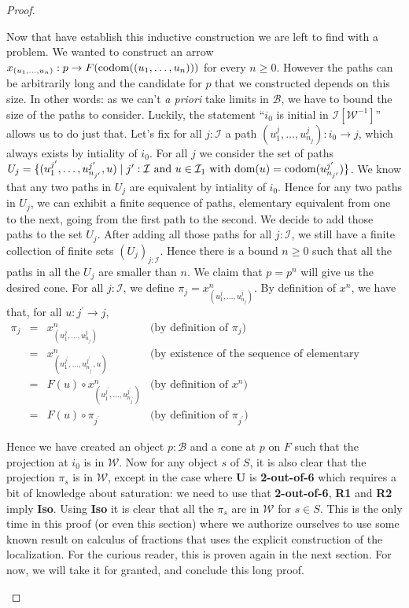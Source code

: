 \documentclass{article}
\numberwithin{equation}{section}
\theoremstyle{definition}
\theoremstyle{plain}
\begin{document}
\begin{proof}
\begin{enumerate}
		Now that have establish this inductive construction we are left to find with a problem. We wanted to construct an arrow $x_{(u_1, \dots, u_n)}: p \to F(\textnormal{codom}((u_1, \dots, u_n)))$ for every $n \ge 0$. However the paths can be arbitrarily long and the candidate for $p$ that we constructed depends on this size. In other words: as we can't \textit{a priori} take limits in $\mathcal{B}$, we have to bound the size of the paths to consider. Luckily, the statement ``$i_0$ is initial in $\mathcal{I}[\mathcal{W}^{-1}]$'' allows us to do just that. Let's fix for all $j:\mathcal{I}$ a path $(u^j_1, \dots, u^j_{n_j}): i_0 \to j$, which always exists by intiality of $i_0$. For all $j$ we consider the set of paths $U_j = \{(u^{j^{\prime}}_1, \dots, u^{j^{\prime}}_{n_{j^{\prime}}},u) \mid j^{\prime}: \mathcal{I} \textnormal{ and } u \in \mathcal{I}_1 \textnormal{ with dom}(u) = \textnormal{codom}(u^{j^{\prime}}_{n_{j^{\prime}}})\}$. We know that any two paths in $U_j$ are equivalent by intiality of $i_0$. Hence for any two paths in $U_j$, we can exhibit a finite sequence of paths, elementary equivalent from one to the next, going from the first path to the second. We decide to add those paths to the set $U_j$. After adding all those paths for all $j:\mathcal{I}$, we still have a finite collection of finite sets $(U_j)_{j:\mathcal{I}}$. Hence there is a bound $n\ge 0$ such that all the paths in all the $U_j$ are smaller than $n$. We claim that $p = p^n$ will give us the desired cone. For all $j:\mathcal{I}$, we define $\pi_j = x^n_{(u^j_1, \dots, u^j_{n_j})}$. By definition of $x^n$, we have that, for all $u: j^{\prime} \to j$,
		\[\begin{array}{rclr}
			\pi_j & = & x^n_{(u^j_1, \dots, u^j_{n_j})} & \text{(by definition of $\pi_j$)}\\
			& = &  x^n_{(u^{j^{\prime}}_1, \dots, u^{j^{\prime}}_{n_{j^{\prime}}},u)} & \text{(by existence of the sequence of elementary equivalences)}\\
			& = & F(u) \circ x^n_{(u^{j^{\prime}}_1, \dots, u^{j^{\prime}}_{n_{j^{\prime}}})} & \text{(by definition of $x^n$)}\\
			& = & F(u) \circ \pi_{j^{\prime}} & \text{(by definition of $\pi_{j^{\prime}}$)}
		\end{array}\]
		
		Hence we have created an object $p:\mathcal{B}$ and a cone at $p$ on $F$ such that the projection at $i_0$ is in $\mathcal{W}$. Now for any object $s$ of $S$, it is also clear that the projection $\pi_s$ is in $\mathcal{W}$, except in the case where \textbf{U} is \textbf{2-out-of-6} which requires a bit of knowledge about saturation: we need to use that \textbf{2-out-of-6}, \textbf{R1} and \textbf{R2} imply \textbf{Iso}. Using \textbf{Iso} it is clear that all the $\pi_s$ are in $\mathcal{W}$ for $s \in S$. This is the only time in this proof (or even this section) where we authorize ourselves to use some known result on calculus of fractions that uses the explicit construction of the localization. For the curious reader, this is proven again in the next section. For now, we will take it for granted, and conclude this long proof.
	\end{enumerate}
\end{proof}
\end{document}
